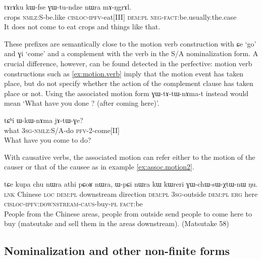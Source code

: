 \documentclass[oldfontcommands,oneside,a4paper,11pt]{article}
\newcommand{\ipa}[1]{{\phon #1}} %
\begin{document}
\begin{exe}
\ex \label{ex:cisloc}
\gll
\ipa{tɤrɤku} 	\ipa{kɯ-fse} 	\ipa{ɣɯ-tu-ndze} 	\ipa{nɯra} 	\ipa{mɤ-ŋgrɤl.} \\
crops \textsc{nmlz}:S-be.like \textsc{cisloc-ipfv}-eat[III] \textsc{dem:pl} \textsc{neg-fact}:be.usually.the.case \\
\glt It does not come to eat crops and things like that.
\end{exe}

These prefixes are semantically close to the motion verb construction with \ipa{ɕe} `go' and \ipa{ɣi} `come' and a complement with the verb in the S/A nominalization form. A crucial difference, however, can be found detected in the perfective:  motion verb constructions such as \ref{ex:motion.verb} imply that the motion event has taken place, but do not specify whether the action of the complement clause has taken place or not. Using the associated motion form \ipa{ɣɯ-tɤ-tɯ-nɤma-t} instead would mean `What have you done ? (after coming here)'.

\begin{exe}
\ex \label{ex:motion.verb}
\gll
\ipa{tɕʰi} 	\ipa{ɯ-kɯ-nɤma} 	\ipa{jɤ-tɯ-ɣe?} \\
what \textsc{3sg-nmlz:}S/A-do \textsc{pfv-2}-come[II] \\
\glt What have you come to do?
\end{exe}


With causative verbs, the associated motion can refer either to the motion of the causer or that of the causee as in example \ref{ex:assoc.motion2}.

  \begin{exe}
\ex \label{ex:assoc.motion2}
\gll
\ipa{tɕe} 	\ipa{kupa} 	\ipa{chu} 	\ipa{nɯra} 	\ipa{athi} 	\ipa{pɕoʁ} 	\ipa{nɯra,} 	\ipa{ɯ-pɕi} 	\ipa{nɯra} 	\ipa{kɯ} 	\ipa{kɯreri} 	\ipa{ɣɯ-chɯ-sɯ-χtɯ-nɯ} 	\ipa{ŋu.}  \\
\textsc{lnk} Chinese \textsc{loc} \textsc{dem:pl} downstream direction \textsc{dem:pl} \textsc{3sg}-outside  \textsc{dem:pl}  \textsc{erg} here \textsc{cisloc-ipfv:downstream-caus}-buy-\textsc{pl} \textsc{fact}:be \\
\glt People from the Chinese areas, people from outside send people to come here to buy (matsutake and sell them in the areas downstream). (Matsutake 58)
  \end{exe} 


\subsection{Nominalization and other non-finite forms}
\end{document}
